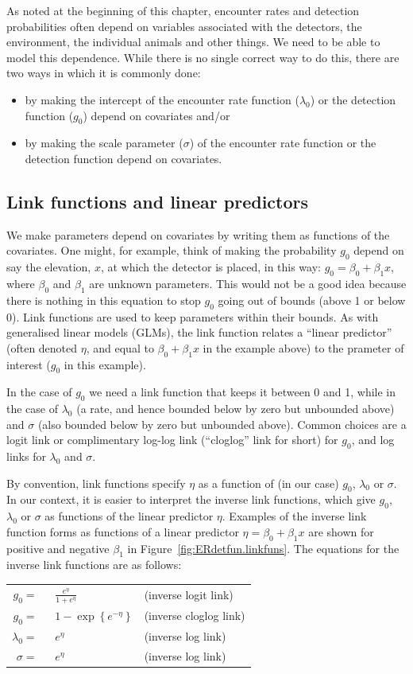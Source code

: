\documentclass[graybox,envcountchap,sectrefs]{SpringerStyleFiles/styles/svmono}\usepackage[]{graphicx}\usepackage[]{color}
\newcommand{\bi}{\begin{itemize}}
\newcommand{\ei}{\end{itemize}}
\begin{document}
As noted at the beginning of this chapter, encounter rates and detection probabilities often depend on variables associated with the detectors, the environment, the individual animals and other things. We need to be able to model this dependence. While there is no single correct way to do this, there are two ways in which it is commonly done:
\bi
\item by making the intercept of the encounter rate function ($\lambda_0$) or the detection function ($g_0$) depend on covariates and/or
\item by making the scale parameter ($\sigma$) of the encounter rate function or the detection function depend on covariates.
\ei

\subsection{Link functions and linear predictors}

We make parameters depend on covariates by writing them as functions of the covariates. One might, for example, think of making the probability $g_0$ depend on say the elevation, $x$, at which the detector is placed, in this way: $g_0=\beta_0 + \beta_1 x$, where $\beta_0$ and $\beta_1$ are unknown parameters. This would not be a good idea because there is nothing in this equation to stop $g_0$ going out of bounds (above 1 or below 0). Link functions are used to keep parameters within their bounds. As with generalised linear models (GLMs), the link function relates a ``linear predictor'' (often denoted $\eta$, and equal to $\beta_0 + \beta_1 x$ in the example above) to the prameter of interest ($g_0$ in this example).

In the case of $g_0$ we need a link function that keeps it between 0 and 1, while in the case of $\lambda_0$ (a rate, and hence bounded below by zero but unbounded above) and $\sigma$ (also bounded below by zero but unbounded above). Common choices are a logit link or complimentary log-log link (``cloglog'' link for short) for $g_0$, and log links for $\lambda_0$ and $\sigma$. 

By convention, link functions specify $\eta$ as a function of (in our case) $g_0$, $\lambda_0$ or $\sigma$. In our context, it is easier to interpret the inverse link functions, which give $g_0$, $\lambda_0$ or $\sigma$ as functions of the linear predictor $\eta$. Examples of the inverse link function forms as functions of a linear predictor $\eta=\beta_0+\beta_1 x$ are shown for positive and negative $\beta_1$ in Figure~\ref{fig:ERdetfun.linkfuns}. The equations for the inverse link functions are as follows:
\begin{center}
\begin{tabular}{ rll } 
$g_0=\;$ & $\;\frac{e^\eta}{1+e^\eta}$ & (inverse logit link) \\
$g_0=\;$ & $\;1-\exp\left\{e^{-\eta}\right\}$ & (inverse cloglog link) \\
$\lambda_0=\;$ & $\;e^\eta$ & (inverse log link) \\
$\sigma=\;$ & $\;e^\eta$ & (inverse log link)
\end{tabular}
\end{center}
\end{document}
